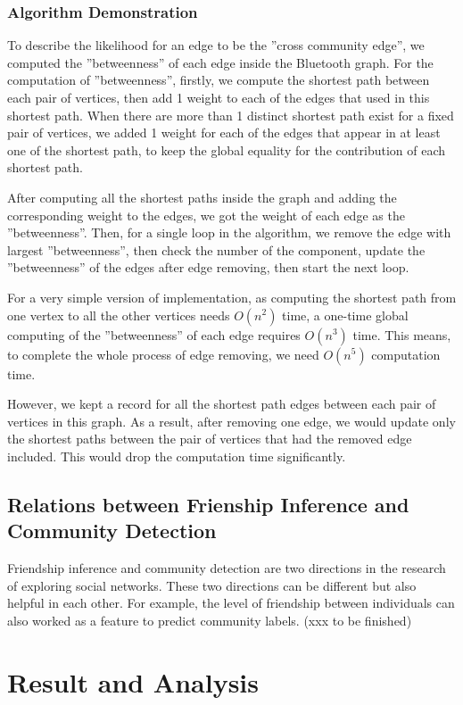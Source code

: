 \documentclass[11pt]{article}
\begin{document}
\subsubsection{Algorithm Demonstration} 
To describe the likelihood for an edge to be the ''cross community edge'', we computed the ''betweenness'' of each edge inside the Bluetooth graph. For the computation of ''betweenness'', firstly, we compute the shortest path between each pair of vertices, then add 1 weight to each of the edges that used in this shortest path. When there are more than 1 distinct shortest path exist for a fixed pair of vertices, we added 1 weight for each of the edges that appear in at least one of the shortest path, to keep the global equality for the contribution of each shortest path.

After computing all the shortest paths inside the graph and adding the corresponding weight to the edges, we got the weight of each edge as the ''betweenness''. Then, for a single loop in the algorithm, we remove the edge with largest ''betweenness'', then check the number of the component, update the ''betweenness'' of the edges after edge removing, then start the next loop.

For a very simple version of implementation, as computing the shortest path from one vertex to all the other vertices needs \(O(n^2)\) time, a one-time global computing of the ''betweenness'' of each edge requires \(O(n^3)\) time. This means, to complete the whole process of edge removing, we need \(O(n^5)\) computation time.

However, we kept a record for all the shortest path edges between each pair of vertices in this graph. As a result, after removing one edge, we would update only the shortest paths between the pair of vertices that had the removed edge included. This would drop the computation time significantly.  
\subsection{Relations between Frienship Inference and Community Detection}
Friendship inference and community detection are two directions in the research of exploring social networks. These two directions can be different but also helpful in each other. For example, the level of friendship between individuals can also worked as a feature to predict community labels. (xxx to be finished)

\section{Result and Analysis} \label{result}
\end{document}
